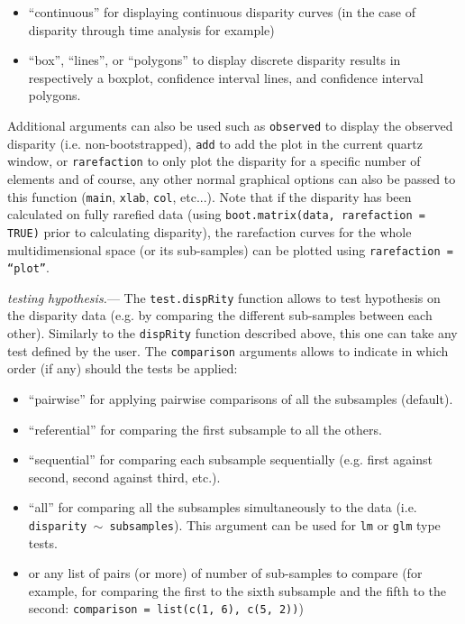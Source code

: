 \documentclass[12pt,letterpaper]{article}
\renewcommand{\subsubsection}[1]{%
\vspace{2ex}
\noindent
\textit{#1.}---}
\newcommand{\disp}{\texttt{dispRity} }
\begin{document}
\begin{itemize}
    \item ``continuous'' for displaying continuous disparity curves (in the case of disparity through time analysis for example)
    \item ``box'', ``lines'', or ``polygons'' to display discrete disparity results in respectively a boxplot, confidence interval lines, and confidence interval polygons.
\end{itemize}

Additional arguments can also be used such as \texttt{observed} to display the observed disparity (i.e. non-bootstrapped), \texttt{add} to add the plot in the current quartz window, or \texttt{rarefaction} to only plot the disparity for a specific number of elements and of course, any other normal graphical options can also be passed to this function (\texttt{main}, \texttt{xlab}, \texttt{col}, etc...).
Note that if the disparity has been calculated on fully rarefied data (using \texttt{boot.matrix(data, rarefaction = TRUE)} prior to calculating disparity), the rarefaction curves for the whole multidimensional space (or its sub-samples) can be plotted using \texttt{rarefaction = ``plot''}.

\subsubsection{testing hypothesis}
The \texttt{test.dispRity} function allows to test hypothesis on the disparity data (e.g. by comparing the different sub-samples between each other).
Similarly to the \disp function described above, this one can take any test defined by the user.
The \texttt{comparison} arguments allows to indicate in which order (if any) should the tests be applied:

\begin{itemize}
    \item ``pairwise'' for applying pairwise comparisons of all the subsamples (default).
    \item ``referential'' for comparing the first subsample to all the others.
    \item ``sequential'' for comparing each subsample sequentially (e.g. first against second, second against third, etc.).
    \item ``all'' for comparing all the subsamples simultaneously to the data (i.e. \texttt{disparity $\mathtt{\sim}$ subsamples}). This argument can be used for \texttt{lm} or \texttt{glm} type tests.
    \item or any list of pairs (or more) of number of sub-samples to compare (for example, for comparing the first to the sixth subsample and the fifth to the second: \texttt{comparison = list(c(1, 6), c(5, 2))})
\end{itemize}
\end{document}
